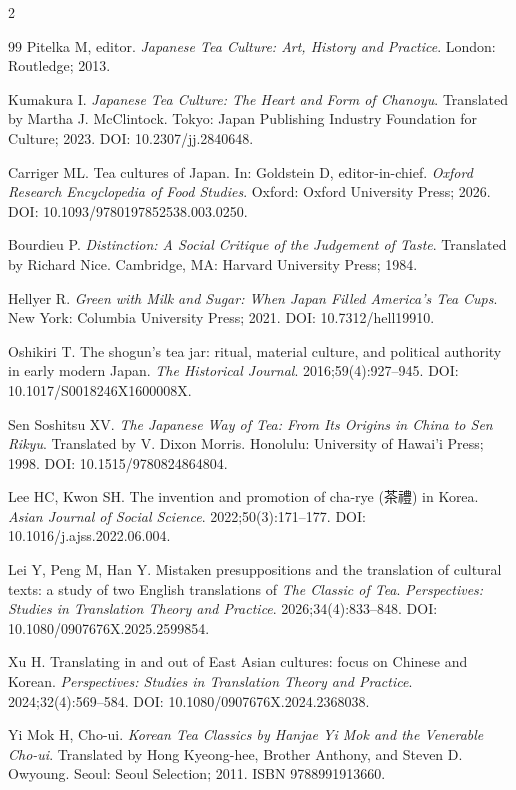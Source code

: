 \documentclass[numbers]{IntechOpen-Book}
\newcommand{\zh}[1]{{\CJKfontspec{Noto Serif CJK SC}\upshape #1}}
\begin{document}
\begin{backmatter}
\begin{multicols}{2}
\begin{thebibliography}{99}
 Pitelka M, editor. \textit{Japanese Tea Culture: Art, History and Practice}. London: Routledge; 2013.

 Kumakura I. \textit{Japanese Tea Culture: The Heart and Form of Chanoyu}. Translated by Martha J. McClintock. Tokyo: Japan Publishing Industry Foundation for Culture; 2023. DOI: 10.2307/jj.2840648.

 Carriger ML. Tea cultures of Japan. In: Goldstein D, editor-in-chief. \textit{Oxford Research Encyclopedia of Food Studies}. Oxford: Oxford University Press; 2026. DOI: 10.1093/9780197852538.003.0250.

 Bourdieu P. \textit{Distinction: A Social Critique of the Judgement of Taste}. Translated by Richard Nice. Cambridge, MA: Harvard University Press; 1984.

 Hellyer R. \textit{Green with Milk and Sugar: When Japan Filled America's Tea Cups}. New York: Columbia University Press; 2021. DOI: 10.7312/hell19910.

 Oshikiri T. The shogun's tea jar: ritual, material culture, and political authority in early modern Japan. \textit{The Historical Journal}. 2016;59(4):927--945. DOI: 10.1017/S0018246X1600008X.

 Sen Soshitsu XV. \textit{The Japanese Way of Tea: From Its Origins in China to Sen Rikyu}. Translated by V. Dixon Morris. Honolulu: University of Hawai'i Press; 1998. DOI: 10.1515/9780824864804.

 Lee HC, Kwon SH. The invention and promotion of cha-rye (\zh{茶禮}) in Korea. \textit{Asian Journal of Social Science}. 2022;50(3):171--177. DOI: 10.1016/j.ajss.2022.06.004.

 Lei Y, Peng M, Han Y. Mistaken presuppositions and the translation of cultural texts: a study of two English translations of \textit{The Classic of Tea}. \textit{Perspectives: Studies in Translation Theory and Practice}. 2026;34(4):833--848. DOI: 10.1080/0907676X.2025.2599854.

 Xu H. Translating in and out of East Asian cultures: focus on Chinese and Korean. \textit{Perspectives: Studies in Translation Theory and Practice}. 2024;32(4):569--584. DOI: 10.1080/0907676X.2024.2368038.

 Yi Mok H, Cho-ui. \textit{Korean Tea Classics by Hanjae Yi Mok and the Venerable Cho-ui}. Translated by Hong Kyeong-hee, Brother Anthony, and Steven D. Owyoung. Seoul: Seoul Selection; 2011. ISBN 9788991913660.


\end{thebibliography}
\end{multicols}
\end{backmatter}
\end{document}
